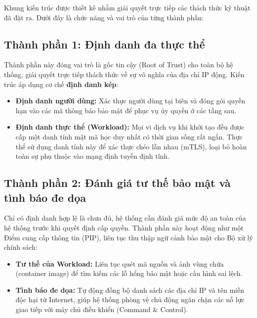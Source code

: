 Khung kiến trúc được thiết kế nhằm giải quyết trực tiếp các thách thức kỹ thuật đã đặt ra. Dưới đây là chức năng và vai trò của từng thành phần:

\subsection{Thành phần 1: Định danh đa thực thể}
Thành phần này đóng vai trò là gốc tin cậy (Root of Trust) cho toàn bộ hệ thống, giải quyết trực tiếp thách thức về sự vô nghĩa của địa chỉ IP động. Kiến trúc áp dụng cơ chế \textbf{định danh kép}:
\begin{itemize}[itemsep=6pt, parsep=0pt]
    \item \textbf{Định danh người dùng:} Xác thực người dùng tại biên và đóng gói quyền hạn vào các mã thông báo bảo mật để phục vụ ủy quyền ở các tầng sau.
    \item \textbf{Định danh thực thể (Workload):} Mọi vi dịch vụ khi khởi tạo đều được cấp một danh tính mật mã học duy nhất có thời gian sống rất ngắn. Thực thể sử dụng danh tính này để xác thực chéo lẫn nhau (mTLS), loại bỏ hoàn toàn sự phụ thuộc vào mạng định tuyến định tĩnh.
\end{itemize}

\subsection{Thành phần 2: Đánh giá tư thế bảo mật và tình báo đe dọa}
Chỉ có định danh hợp lệ là chưa đủ, hệ thống cần đánh giá mức độ an toàn của hệ thống trước khi quyết định cấp quyền. Thành phần này hoạt động như một Điểm cung cấp thông tin (PIP), liên tục thu thập ngữ cảnh bảo mật cho Bộ xử lý chính sách:
\begin{itemize}[itemsep=6pt, parsep=0pt]
    \item \textbf{Tư thế của Workload:} Liên tục quét mã nguồn và ảnh vùng chứa (container image) để tìm kiếm các lỗ hổng bảo mật hoặc cấu hình sai lệch.
    \item \textbf{Tình báo đe dọa:} Tự động đồng bộ danh sách các địa chỉ IP và tên miền độc hại từ Internet, giúp hệ thống phòng vệ chủ động ngăn chặn các nỗ lực giao tiếp với máy chủ điều khiển (Command \& Control).
\end{itemize}

